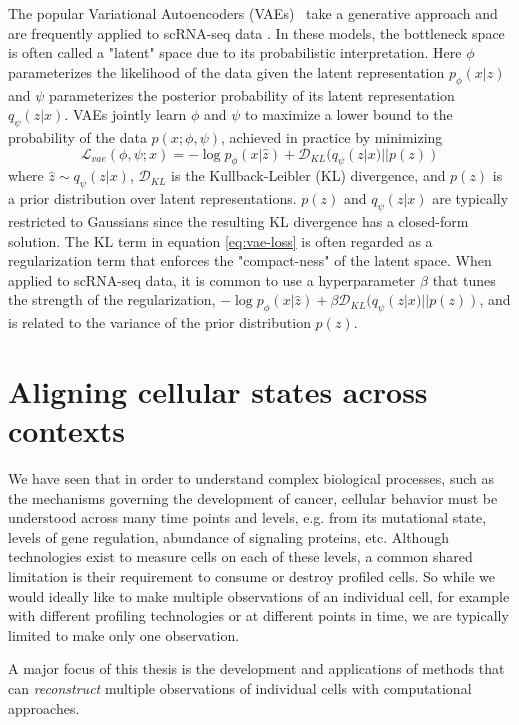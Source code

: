 The popular Variational Autoencoders (VAEs)~\citep{kingma2013} take a generative approach and are frequently applied to scRNA-seq data \cite{lopez2018, huang2018, eraslan2019, lotfollahi2019}.
In these models, the bottleneck space is often called a "latent" space due to its probabilistic interpretation.
Here $\phi$ parameterizes the likelihood of the data given the latent representation $p_\phi(x|z)$ and $\psi$ parameterizes the posterior probability of its latent representation $q_\psi(z|x)$.
VAEs jointly learn $\phi$ and $\psi$ to maximize a lower bound to the probability of the data $p(x; \phi, \psi)$, achieved in practice by minimizing
\begin{equation}
    \mathcal{L}_{vae}(\phi, \psi; x) = -\log p_\phi(x | \hat{z}) + \mathcal{D}_{KL}(q_\psi(z|x) || p(z))
    \label{eq:vae-loss}
\end{equation}
where $\hat{z} \sim q_\psi(z|x)$, $\mathcal{D}_{KL}$ is the Kullback-Leibler (KL) divergence,
and $p(z)$ is a prior distribution over latent representations.
$p(z)$ and $q_\psi(z|x)$ are typically restricted to Gaussians since the resulting KL divergence has a closed-form solution.
The KL term in equation \ref{eq:vae-loss} is often regarded as a regularization term that enforces the "compact-ness" of the latent space.
When applied to scRNA-seq data, it is common to use a hyperparameter $\beta$ that tunes the strength of the regularization, 
$-\log p_\phi(x | \hat{z}) + \beta \mathcal{D}_{KL}(q_\psi(z|x) || p(z))$,
and is related to the variance of the prior distribution $p(z)$.

\section{Aligning cellular states across contexts}
We have seen that in order to understand complex biological processes, such as the mechanisms governing the development of cancer, cellular behavior must be understood across many time points and levels, e.g. from its mutational state, levels of gene regulation, abundance of signaling proteins, etc.
Although technologies exist to measure cells on each of these levels,
a common shared limitation is their requirement to consume or destroy profiled cells.
So while we would ideally like to make multiple observations of an individual cell, for example with different profiling technologies or at different points in time, we are typically limited to make only one observation.

A major focus of this thesis is the development and applications of methods that can \emph{reconstruct} multiple observations of individual cells with computational approaches.

